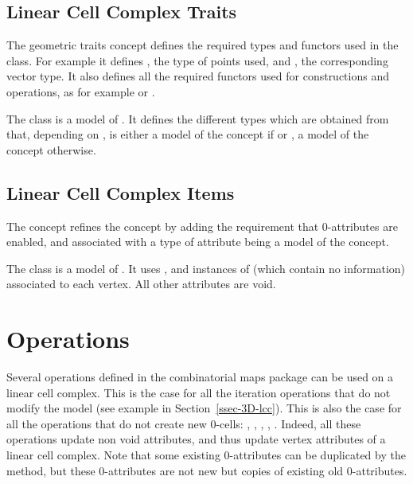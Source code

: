 \subsection{Linear Cell Complex Traits}\label{ssec-lcc-traits}

The  geometric traits concept defines the
required types and functors used in the 
class. For example it defines , the type of points used,
and , the corresponding vector type.  It also defines all
the required functors used for constructions and operations, as for
example  or
.

The class  is a model of
. It defines the different types which
are obtained from  that, depending on , is either a model of
the concept  if  or , a model of the
concept  otherwise.


\subsection{Linear Cell Complex Items}\label{ssec-lcc-item}

The  concept refines the
 concept by adding the requirement that
0-attributes are enabled, and associated with a type of attribute
being a model of the  concept.  

The class  is a
model of . It uses ,
and instances of 
(which contain no information) associated to each vertex. All other
attributes are void.  

\section{Operations}

Several operations defined in the combinatorial maps package can be
used on a linear cell complex. This is the case for all the iteration
operations that do not modify the model (see example in 
Section~\ref{ssec-3D-lcc}). This is also the case for
all the operations that do not create new 0-cells: ,
, , ,
.  Indeed, all these operations update
non void attributes, and thus update vertex attributes of a linear
cell complex. Note that some existing 0-attributes can be duplicated
by the  method, but these 0-attributes are not new but
copies of existing old 0-attributes.

